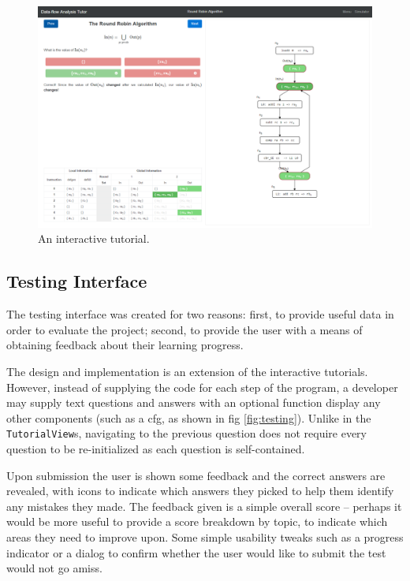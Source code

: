 \documentclass[bsc,twoside,singlespacing,parskip,logo,notimes,normalheadings]{infthesis}
\begin{document}
        \begin{figure}[p]
          \centering
          \includegraphics[width=\textheight, angle=-90]{img/lesson.png}
          \captionsetup{width=\textwidth, justification=centering}
          \caption{An interactive tutorial.}\label{fig:tutorial}
        \end{figure}

        \subsection{Testing Interface}\label{sec:impl-testing}

        The testing interface was created for two reasons: first, to
        provide useful data in order to evaluate the project; second,
        to provide the user with a means of obtaining feedback about
        their learning progress.

        The design and implementation is an extension of the
        interactive tutorials. However, instead of supplying the code
        for each step of the program, a developer may supply text
        questions and answers with an optional function display any
        other components (such as a \gls{cfg}, as shown in fig
        \ref{fig:testing}). Unlike in the {\tt TutorialView}s,
        navigating to the previous question does not require every
        question to be re-initialized as each question is
        self-contained.

        Upon submission the user is shown some feedback and the
        correct answers are revealed, with icons to indicate which
        answers they picked to help them identify any mistakes they
        made. The feedback given is a simple overall score -- perhaps
        it would be more useful to provide a score breakdown by topic,
        to indicate which areas they need to improve upon. Some simple
        usability tweaks such as a progress indicator or a dialog to
        confirm whether the user would like to submit the test would
        not go amiss.
\end{document}
